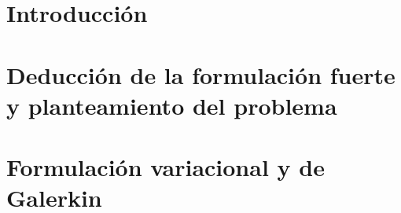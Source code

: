 \documentclass[10pt]{article}
\theoremstyle{definition}
\theoremstyle{remark}
\theoremstyle{definition}
\begin{document}
  \section{Introducci\'on}
    
  \section{Deducci\'on de la formulaci\'on fuerte y planteamiento del problema}
    
  \section{Formulaci\'on variacional y de Galerkin}
    



  
%   
%   
%   
%   
%   
  
%   
  
\end{document}
